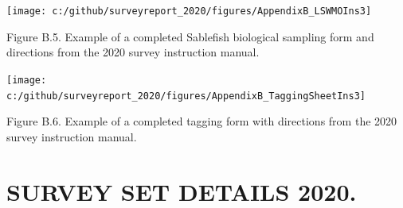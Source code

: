 \documentclass[12pt]{article}\usepackage[]{graphicx}\usepackage[]{color}
\begin{document}
\begin{appendices}
\clearpage
\begin{flushleft}\texttt{[image: c:/github/surveyreport\_2020/figures/AppendixB\_LSWMOIns3]} \end{flushleft}

Figure B.5. Example of a completed Sablefish biological sampling form and directions from the 2020 survey instruction manual.

\clearpage
\begin{flushleft}\texttt{[image: c:/github/surveyreport\_2020/figures/AppendixB\_TaggingSheetIns3]} \end{flushleft}

Figure B.6. Example of a completed tagging form with directions from the 2020 survey instruction manual.

\clearpage

\section{SURVEY SET DETAILS 2020.}
\label{app:third-appendix}


\end{appendices}
\end{document}
